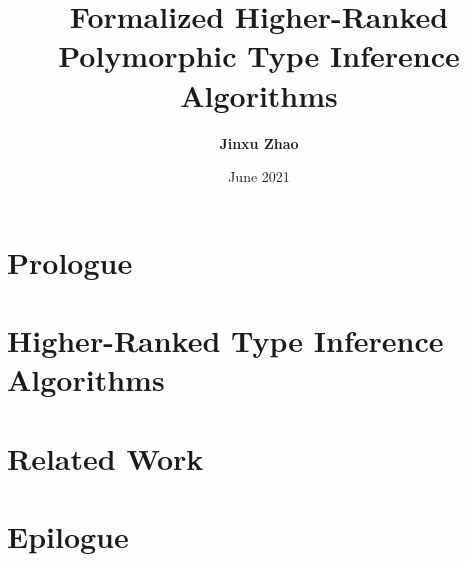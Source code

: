 



\title{Formalized Higher-Ranked Polymorphic Type Inference Algorithms}
\author{\textbf{Jinxu Zhao}}
\date{June 2021}
 



\maketitle

\begin{abstract}
 
\end{abstract}


\frontmatter
\makedeclaration
\makeAck
\tableofcontents
\listoffigures
\listoftables

\mainmatter

\part{Prologue}





\part{Higher-Ranked Type Inference Algorithms}






\part{Related Work}



\part{Epilogue}





\cleardoublepage





